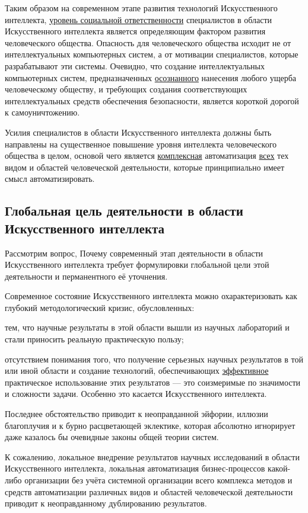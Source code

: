 Таким образом на современном этапе развития технологий Искусственного интеллекта, \uline{уровень социальной ответственности} специалистов в области Искусственного интеллекта является определяющим фактором развития человеческого общества.
Опасность для человеческого общества исходит не от интеллектуальных компьютерных систем, а от мотивации специалистов, которые разрабатывают эти системы. Очевидно, что создание интеллектуальных компьютерных систем, предназначенных \uline{осознанного} нанесения любого ущерба человеческому обществу, и требующих создания соответствующих интеллектуальных средств обеспечения безопасности, является короткой дорогой к самоуничтожению.

Усилия специалистов в области Искусственного интеллекта должны быть направлены на существенное повышение уровня интеллекта человеческого общества в целом, основой чего является \uline{комплексная} автоматизация \uline{всех} тех видом и областей человеческой деятельности, которые принципиально имеет смысл автоматизировать.

\subsection*{Глобальная цель деятельности в области Искусственного интеллекта}
Рассмотрим вопрос, Почему современный этап деятельности в области Искусственного интеллекта требует формулировки глобальной цели этой деятельности и перманентного её уточнения.

Современное состояние Искусственного интеллекта можно охарактеризовать как глубокий методологический кризис, обусловленных:
\begin{textitemize}
	\item тем, что научные результаты в этой области вышли из научных лабораторий и стали приносить реальную практическую пользу;
	\item отсутствием понимания того, что получение серьезных научных результатов в той или иной области и создание технологий, обеспечивающих \uline{эффективное} практическое использование этих результатов --- это соизмеримые по значимости и сложности задачи. Особенно это касается Искусственного интеллекта.
\end{textitemize}

Последнее обстоятельство приводит к неоправданной эйфории, иллюзии благоплучия и к бурно расцветающей эклектике, которая абсолютно игнорирует даже казалось бы очевидные законы общей теории систем.

К сожалению, локальное внедрение результатов научных исследований в области Искусственного интеллекта, локальная автоматизация бизнес-процессов какой-либо организации без учёта системной организации всего комплекса методов и средств автоматизации различных видов и областей человеческой деятельности приводит к неоправданному дублированию результатов. 

